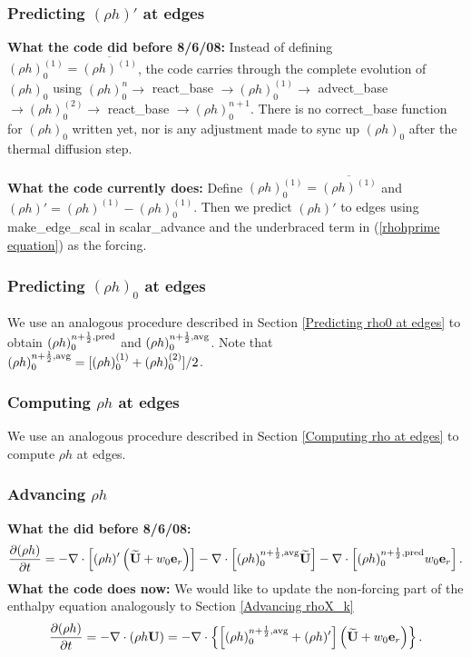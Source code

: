 \documentclass[11pt]{article}
\def\half  {\frac{1}{2}}
\def\eb    {{\bf e}}
\def\Ub    {{\bf U}}
\def\Ubt   {\widetilde{\bf U}}
\begin{document}
\subsubsection{Predicting $(\rho h)'$ at edges}\label{Predicting rhohprime at edges}
{\bf What the code did before 8/6/08:}
 Instead of defining $(\rho h)_0^{(1)} = \overline{(\rho h)^{(1)}}$, the code carries 
through the complete evolution of $(\rho h)_0$ using $(\rho h)_0^n \rightarrow$ react\_base 
$\rightarrow (\rho h)_0^{(1)} \rightarrow$ advect\_base 
$\rightarrow (\rho h)_0^{(2)} \rightarrow$ react\_base $\rightarrow (\rho h)_0^{n+1}$.  
There is no correct\_base function for $(\rho h)_0$ written yet, nor is any adjustment made 
to sync up $(\rho h)_0$ after the thermal diffusion step.\\ \\
{\bf What the code currently does:}  Define $(\rho h)_0^{(1)} = \overline{(\rho h)^{(1)}}$  
and $(\rho h)' = (\rho h)^{(1)}-(\rho h)_0^{(1)}$.  Then we predict $(\rho h)'$ to 
edges using make\_edge\_scal in scalar\_advance and the underbraced term in 
(\ref{rhohprime equation}) as the forcing.
\subsubsection{Predicting $(\rho h)_0$ at edges}
We use an analogous procedure described in Section \ref{Predicting rho0 at edges} to 
obtain $(\rho h)_0^{n+\half,\rm{pred}}$ and $(\rho h)_0^{n+\half,\rm{avg}}$.  Note that 
$(\rho h)_0^{n+\half,{\rm avg}} = [(\rho h)_0^{(1)} + (\rho h)_0^{(2)}]/2$.
\subsubsection{Computing $\rho h$ at edges}
We use an analogous procedure described in Section \ref{Computing rho at edges} to compute
$\rho h$ at edges.
\subsubsection{Advancing $\rho h$}
{\bf What the did before 8/6/08:}
\begin{equation}
\frac{\partial(\rho h)}{\partial t} = -\nabla\cdot\left[(\rho h)'\left(\Ubt 
+ w_0\eb_r\right)\right] - \nabla\cdot\left[(\rho h)_0^{n+\half,{\rm avg}}\Ubt\right] 
- \nabla\cdot\left[(\rho h)_0^{n+\half,{\rm pred}}w_0\eb_r\right].
\end{equation}
{\bf What the code does now:} We would like to update the 
non-forcing part of the enthalpy equation analogously to Section \ref{Advancing rhoX_k}
\begin{equation}
\frac{\partial(\rho h)}{\partial t} = -\nabla\cdot(\rho h\Ub) = 
-\nabla\cdot\left\{\left[(\rho h)_0^{n+\half,{\rm avg}} 
+ (\rho h)'\right]\left(\Ubt + w_0\eb_r\right)\right\}.
\end{equation}
\end{document}
